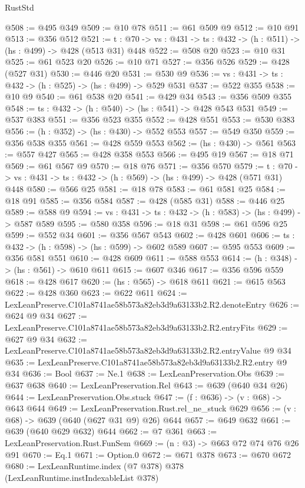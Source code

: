 \begin{lexlean}{RustStd}
\begin{coremodule}
@508 := @495 @349
@509 := @10 @78
@511 := @61 @509 @9
@512 := @10 @91
@513 := @356 @512
@521 := {t : @70} -> {vs : @431} -> {ts : @432} -> (h : @511) -> (hs : @499) -> @428 (@513 @31) @448
@522 := @508 @20
@523 := @10 @31
@525 := @61 @523 @20
@526 := @10 @71
@527 := @356 @526
@529 := @428 (@527 @31)
@530 := @446 @20
@531 := @530 @9
@536 := {vs : @431} -> {ts : @432} -> (h : @525) -> (hs : @499) -> @529 @531
@537 := @522 @355
@538 := @10 @9
@540 := @61 @538 @20
@541 := @429 @34
@543 := @356 @509 @355
@548 := {ts : @432} -> (h : @540) -> (hs : @541) -> @428 @543 @531
@549 := @537 @383
@551 := @356 @523 @355
@552 := @428 @551
@553 := @530 @383
@556 := (h : @352) -> (hs : @430) -> @552 @553
@557 := @549 @350
@559 := @356 @538 @355
@561 := @428 @559 @553
@562 := (hs : @430) -> @561
@563 := @557 @427
@565 := @428 @358 @553
@566 := @495 @19
@567 := @18 @71
@569 := @61 @567 @9
@570 := @18 @76
@571 := @356 @570
@579 := {t : @70} -> {vs : @431} -> {ts : @432} -> (h : @569) -> (hs : @499) -> @428 (@571 @31) @448
@580 := @566 @25
@581 := @18 @78
@583 := @61 @581 @25
@584 := @18 @91
@585 := @356 @584
@587 := @428 (@585 @31)
@588 := @446 @25
@589 := @588 @9
@594 := {vs : @431} -> {ts : @432} -> (h : @583) -> (hs : @499) -> @587 @589
@595 := @580 @358
@596 := @18 @31
@598 := @61 @596 @25
@599 := @552 @34
@601 := @356 @567 @543
@602 := @428 @601
@606 := {ts : @432} -> (h : @598) -> (hs : @599) -> @602 @589
@607 := @595 @553
@609 := @356 @581 @551
@610 := @428 @609
@611 := @588 @553
@614 := (h : @348) -> (hs : @561) -> @610 @611
@615 := @607 @346
@617 := @356 @596 @559
@618 := @428 @617
@620 := (hs : @565) -> @618 @611
@621 := @615 @563
@622 := @428 @360
@623 := @622 @611
@624 := LexLeanPreserve.C101a8741ae58b573a82eb3d9a63133b2.R2.denoteEntry
@626 := @624 @9 @34
@627 := LexLeanPreserve.C101a8741ae58b573a82eb3d9a63133b2.R2.entryFits
@629 := @627 @9 @34
@632 := LexLeanPreserve.C101a8741ae58b573a82eb3d9a63133b2.R2.entryValue @9 @34
@635 := LexLeanPreserve.C101a8741ae58b573a82eb3d9a63133b2.R2.entry @9 @34
@636 := Bool
@637 := Ne.{1}
@638 := LexLeanPreservation.Obs
@639 := @637 @638
@640 := LexLeanPreservation.Rel
@643 := @639 (@640 @34 @26)
@644 := LexLeanPreservation.Obs.stuck
@647 := (f : @636) -> (v : @68) -> @643 @644
@649 := LexLeanPreservation.Rust.rel_ne_stuck @629
@656 := (v : @68) -> @639 (@640 (@627 @31 @9) @26) @644
@657 := @649 @632
@661 := @639 (@640 @629 @632) @644
@662 := @7 @361
@663 := LexLeanPreservation.Rust.FunSem
@669 := (n : @3) -> @663 @72 @74 @76 @26 @91
@670 := Eq.{1}
@671 := Option.{0}
@672 := @671 @378
@673 := @670 @672
@680 := LexLeanRuntime.index (@7 @378) @378 (LexLeanRuntime.instIndexableList @378)

\end{coremodule}
\end{lexlean}
